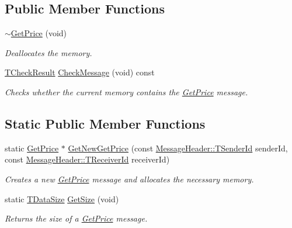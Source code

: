 \subsection*{Public Member Functions}
\begin{DoxyCompactItemize}
\item 
\hyperlink{class_terra_swarm_1_1_synchronous_1_1_get_price_a1727e44cb45249ec35fdcd84b4b0b331}{$\sim$\-Get\-Price} (void)
\begin{DoxyCompactList}\small\item\em Deallocates the memory. \end{DoxyCompactList}\item 
\hyperlink{class_terra_swarm_1_1_synchronous_1_1_get_price_a174c0399b878132f69b36c99ec7a09b4}{T\-Check\-Result} \hyperlink{class_terra_swarm_1_1_synchronous_1_1_get_price_a9d05dcfb45a62ffe7891c31fbd1fb4ca}{Check\-Message} (void) const 
\begin{DoxyCompactList}\small\item\em Checks whether the current memory contains the \hyperlink{class_terra_swarm_1_1_synchronous_1_1_get_price}{Get\-Price} message. \end{DoxyCompactList}\end{DoxyCompactItemize}
\subsection*{Static Public Member Functions}
\begin{DoxyCompactItemize}
\item 
static \hyperlink{class_terra_swarm_1_1_synchronous_1_1_get_price}{Get\-Price} $\ast$ \hyperlink{class_terra_swarm_1_1_synchronous_1_1_get_price_a989d177a7d82912fb902f99304f84433}{Get\-New\-Get\-Price} (const \hyperlink{class_terra_swarm_1_1_message_header_a516b36855e2aad7cfbf8770f1b42784f}{Message\-Header\-::\-T\-Sender\-Id} sender\-Id, const \hyperlink{class_terra_swarm_1_1_message_header_aa3260702b182b6f88ddbdd3416e98df0}{Message\-Header\-::\-T\-Receiver\-Id} receiver\-Id)
\begin{DoxyCompactList}\small\item\em Creates a new \hyperlink{class_terra_swarm_1_1_synchronous_1_1_get_price}{Get\-Price} message and allocates the necessary memory. \end{DoxyCompactList}\item 
static \hyperlink{namespace_terra_swarm_a092e6ec9739175076ae3106783f5c1b6}{T\-Data\-Size} \hyperlink{class_terra_swarm_1_1_synchronous_1_1_get_price_a424d231d9de597d35ffc1359bdcea4b2}{Get\-Size} (void)
\begin{DoxyCompactList}\small\item\em Returns the size of a \hyperlink{class_terra_swarm_1_1_synchronous_1_1_get_price}{Get\-Price} message. \end{DoxyCompactList}\end{DoxyCompactItemize}
